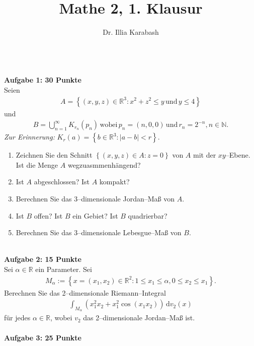 \documentclass[a4paper,12pt]{article}
\newcommand{\td}{\,\text{d}}
\numberwithin{equation}{section}
\begin{document}

\title{Mathe 2, 1. Klausur}
\author{Dr. Illia Karabash}
\maketitle
{}
\hfill\\\textbf{Aufgabe 1: 30 Punkte}\\ 
Seien
\begin{align} 
        A=\left\{\left(x,y,z\right) \in \mathbb{R}^3:x^2+z^2\leq y\,\text{und}\,y\leq 4\right\}
\end{align} 
und
\begin{align} 
        B=\bigcup _{n=1}^\infty K_{r_n}\left(p_n\right)\,\text{wobei}\,p_n=\left(n,0,0\right)\,\text{und}\,r_n=2^{-n},n  \in \mathbb{N}
.\end{align} 
\textit{Zur Erinnerung:} $K_r\left(a\right)=\left\{b \in \mathbb{R}^3:|a-b|<r\right\}$.
\begin{enumerate}[label=(\alph*)]
        \item Zeichnen Sie den Schnitt $\left\{\left(x,y,z\right) \in A:z=0\right\}$ von $A$ mit der $xy$--Ebene. Ist die Menge $A$ wegzuasmmenhängend?
        \item Ist $A$ abgeschlossen? Ist $A$ kompakt?
        \item Berechnen Sie das 3--dimensionale Jordan--Maß von $A$.
        \item Ist $B$ offen? Ist $B$ ein Gebiet? Ist $B$ quadrierbar?
        \item Berechnen Sie das 3--dimensionale Lebesgue--Maß von $B$.
\end{enumerate}
\hfill\\\textbf{Aufgabe 2: 15 Punkte}\\ 
Sei $\alpha  \in \mathbb{R}$ ein Parameter. Sei
\begin{align} 
        M_\alpha :=\left\{x=\left(x_1,x_2\right) \in \mathbb{R}^2:1\leq x_1\leq \alpha ,0\leq x_2\leq x_1\right\}
.\end{align} 
Berechnen Sie das 2--dimensionale Riemann--Integral
\begin{align} 
        \int_{M_\alpha }^{}\left(x_1^2x_2+x_1^2\cos \left(x_1x_2\right)\right)\td v_2\left(x\right)
\end{align} 
für jedes $\alpha  \in \mathbb{R}$, wobei $v_2$ das 2--dimensionale Jordan--Maß ist.
\\\hfill\\\textbf{Aufgabe 3: 25 Punkte}\\ 
\end{document}
